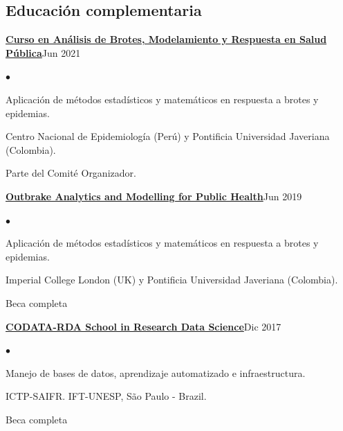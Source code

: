 \documentclass[margin,line]{res}
\newenvironment{list2}{
	\begin{list}{$\bullet$}{%
			\setlength{\itemsep}{0in}
			\setlength{\parsep}{0in} \setlength{\parskip}{0in}
			\setlength{\topsep}{0in} \setlength{\partopsep}{0in}
			\setlength{\leftmargin}{0.2in}}}{\end{list}}
\begin{document}
\begin{resume}
		
		\section{\sc Educación complementaria}
		
		{\bf \href{https://www.cursoepidemias-col-peru-2021.org/}{Curso en Análisis de Brotes, Modelamiento y Respuesta en Salud Pública}}\hfill {Jun 2021}\\
		\vspace*{-.1in}%
		\begin{list2} %
			\item Aplicación de métodos estadísticos y matemáticos en respuesta a brotes y epidemias.%
			\item Centro Nacional de Epidemiología (Perú) y Pontificia Universidad Javeriana (Colombia). %
			\item Parte del Comité Organizador.
		\end{list2}
		
				{\bf \href{https://www.ins.gov.co/modelamiento/modelamiento.html}{Outbrake Analytics and Modelling for Public Health}}\hfill {Jun 2019}\\
		\vspace*{-.1in}%
		\begin{list2} %
			\item Aplicación de métodos estadísticos y matemáticos en respuesta a brotes y epidemias.%
			\item Imperial College London (UK) y Pontificia Universidad Javeriana (Colombia). %
			\item Beca completa
		\end{list2}
		
		{\bf \href{https://www.ictp-saifr.org/international-school-on-data-science/}{CODATA-RDA School in Research Data Science}}\hfill {Dic 2017}\\
		\vspace*{-.1in}%
		\begin{list2} %
			\item Manejo de bases de datos, aprendizaje automatizado e infraestructura.%
			\item ICTP-SAIFR. IFT-UNESP, S{\~a}o Paulo - Brazil. %
			\item Beca completa
		\end{list2}
	

\end{resume}
\end{document}

